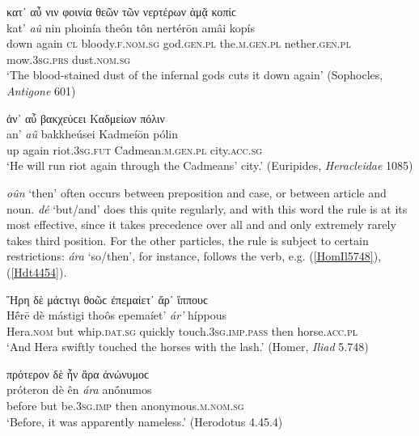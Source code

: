 \begin{exe}
\ex κατ᾽ αὖ νιν φοινία θεῶν τῶν νερτέρων ἀμᾷ κοπίϲ\\
\gll kat' \emph{aû} nin phoinía theôn tôn nertérōn amâi kopís\\
down again \textsc{cl} bloody.\textsc{f.nom.sg} god.\textsc{gen.pl}
the.\textsc{m.gen.pl} nether.\textsc{gen.pl} mow.\textsc{3sg.prs} dust.\textsc{nom.sg}\\
\trans `The blood-stained dust of the infernal gods cuts it down again' (Sophocles, \textit{Antigone} 601)
\label{SophAnt601}
\end{exe}

\begin{exe}
\ex ἀν᾽ αὖ βακχεύϲει Καδμείων πόλιν\\
\gll an' \emph{aû} bakkheúsei Kadmeíōn pólin\\
up again riot.\textsc{3sg.fut} Cadmean.\textsc{m.gen.pl} city.\textsc{acc.sg}\\
\trans `He will run riot again through the Cadmeans' city.' (Euripides, \textit{Heracleidae} 1085)
\label{EurHer1085}
\end{exe}

\emph{oûn} `then' often occurs between preposition and case, or between article and noun. \emph{dé} `but/and' does this quite regularly, and with this word the rule is at its most effective, since it takes precedence over all  and  and only extremely rarely takes third position. For the other particles, the rule is subject to certain restrictions: \textit{ára} `so/then', for instance, follows the verb, e.g. (\ref{HomIl5748}), (\ref{Hdt4454}). 

\begin{exe}
\ex Ἥρη δὲ μάϲτιγι θοῶϲ ἐπεμαίετ᾽ ἄρ᾽ ἵππουϲ\\
\gll Hḗrē dè mástigi thoôs epemaíet' \emph{ár'} híppous\\
Hera.\textsc{nom} but whip.\textsc{dat.sg} quickly touch.\textsc{3sg.imp.pass} then horse.\textsc{acc.pl}\\
\trans `And Hera swiftly touched the horses with the lash.' (Homer, \textit{Iliad} 5.748)
\label{HomIl5748}
\end{exe}

\begin{exe}
\ex πρότερον δὲ ἦν ἄρα ἀνώνυμοϲ\\
\gll próteron dè ên \emph{ára} anṓnumos\\
before but be.\textsc{3sg.imp} then anonymous.\textsc{m.nom.sg}\\
\trans `Before, it was apparently nameless.' (Herodotus 4.45.4)
\label{Hdt4454}
\end{exe}

